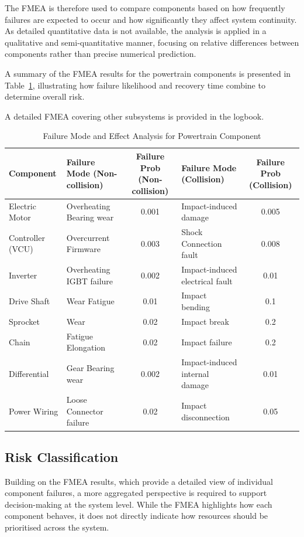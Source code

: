 The FMEA is therefore used to compare components based on how frequently failures are expected to occur and how significantly they affect system continuity. As detailed quantitative data is not available, the analysis is applied in a qualitative and semi-quantitative manner, focusing on relative differences between components rather than precise numerical prediction.

A summary of the FMEA results for the powertrain components is presented in Table~\ref{tab:fmea}, illustrating how failure likelihood and recovery time combine to determine overall risk.

A detailed FMEA covering other subsystems is provided in the logbook.

\begin{table}[H]
\centering
\small
\renewcommand{\arraystretch}{1.5}

\caption{Failure Mode and Effect Analysis for Powertrain Component}
\label{tab:fmea}

\begin{tabularx}{\textwidth}{l X c X c}
\toprule
Component & Failure Mode (Non-collision) & Failure Prob (Non-collision) & Failure Mode (Collision) & Failure Prob (Collision) \\
\midrule
Electric Motor & Overheating Bearing wear & 0.001 & Impact-induced damage & 0.005 \\
Controller (VCU) & Overcurrent Firmware & 0.003 & Shock Connection fault & 0.008 \\
Inverter & Overheating IGBT failure & 0.002 & Impact-induced electrical fault & 0.01 \\
Drive Shaft & Wear Fatigue & 0.01 & Impact bending & 0.1 \\
Sprocket & Wear & 0.02 & Impact break & 0.2 \\
Chain & Fatigue Elongation & 0.02 & Impact failure & 0.2 \\
Differential & Gear Bearing wear & 0.002 & Impact-induced internal damage & 0.01 \\
Power Wiring & Loose Connector failure & 0.02 & Impact disconnection & 0.05 \\
\bottomrule
\end{tabularx}
\end{table}

\subsection{Risk Classification}

Building on the FMEA results, which provide a detailed view of individual component failures, a more aggregated perspective is required to support decision-making at the system level. While the FMEA highlights how each component behaves, it does not directly indicate how resources should be prioritised across the system.


